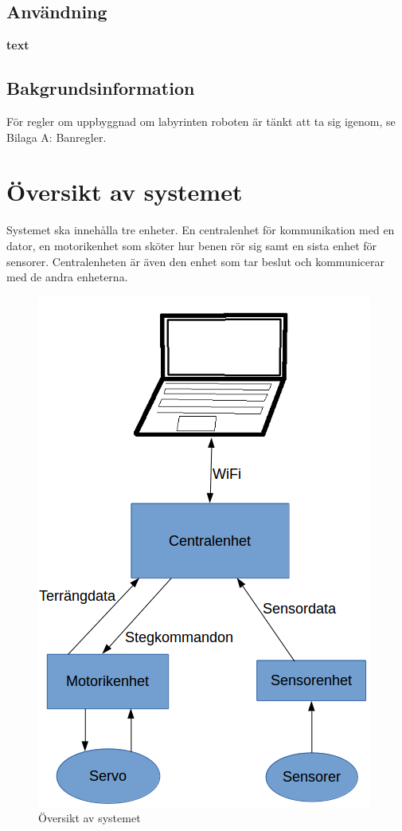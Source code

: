 \documentclass[a4paper,titlepage,12pt]{article}
\begin{document}
	\subsection{Användning}
	\textbf{text}
	\subsection{Bakgrundsinformation}
	För regler om uppbyggnad om labyrinten roboten är tänkt att ta sig igenom, se
	Bilaga A: Banregler.


	\section{Översikt av systemet}
	Systemet ska innehålla tre enheter. En centralenhet för kommunikation med en dator, en motorikenhet
	som sköter hur benen rör sig samt en sista enhet för sensorer. Centralenheten är även den enhet som
	tar beslut och kommunicerar med de andra enheterna.
	\begin{figure}[h!]
		\centering
		\includegraphics[width=0.8\linewidth]{images/overview.png}
		\caption{Översikt av systemet}
		\label{fig:images/overview}
	\end{figure}
\end{document}
